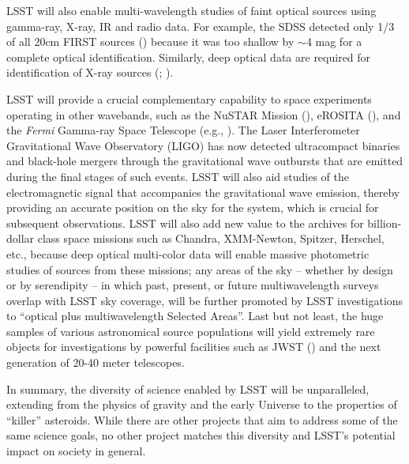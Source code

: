 LSST will also enable multi-wavelength studies of faint optical
sources using gamma-ray, X-ray, IR and radio data.  For example, the
SDSS detected only 1/3 of all 20cm FIRST sources (\cite{1995ApJ...450..559B})
because it was too shallow by $\sim$4 mag for a complete optical
identification. Similarly, deep optical data are required for
identification of X-ray sources (\cite{2005ARA&A..43..827B}; \cite{2017AN....338..241B}).

LSST will provide a crucial complementary capability to space
experiments operating in other wavebands, such as the
NuSTAR Mission (\cite{2013ApJ...770..103H}),
eROSITA (\cite{2012arXiv1209.3114M}),
and the {\it Fermi}
Gamma-ray Space Telescope (e.g., \cite{2009ApJ...697.1071A}).
The Laser Interferometer Gravitational
Wave Observatory (LIGO) has now detected ultracompact binaries and black-hole mergers through the
gravitational wave outbursts that are emitted during the final stages of such events.
LSST will also aid studies of  the electromagnetic signal that accompanies the gravitational wave emission,
thereby providing an accurate position on the sky for the system, which is
crucial for subsequent observations. LSST will also add new value to the archives for
billion-dollar class space missions such as Chandra, XMM-Newton, Spitzer, Herschel,
etc., because deep optical multi-color data will enable
massive photometric  studies of sources from these missions;
any areas of the sky -- whether by design or by serendipity -- in which past, present, or future
multiwavelength surveys overlap with LSST sky coverage, will be further promoted by LSST
investigations to ``optical plus multiwavelength Selected Areas''.
Last but not least, the huge samples of various astronomical source
populations will yield extremely rare objects for investigations by powerful
facilities such as JWST (\cite{2006SSRv..123..485G}) and the next generation
of 20-40 meter telescopes.

In summary, the diversity of science enabled by LSST will be
unparalleled, extending from the physics of gravity and the
early Universe to the properties of ``killer'' asteroids. While
there are other projects that aim to address some of the same
science goals, no other project matches this diversity and
LSST's potential impact on society in general.
